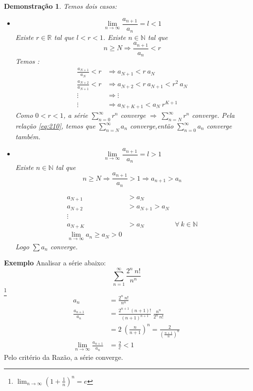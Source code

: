 \documentclass[12pt,openany]{book}
\newtheorem{demonstration}{Demonstração}
\begin{document}
\begin{demonstration}
Temos dois casos:
\begin{itemize}
\item [a.] $$\lim_{n \rightarrow \infty} \frac{a_{n+1}}{a_n} = l < 1 $$ Existe $r \in \mathds{R}$ tal que $l < r < 1$. Existe $n \in \mathds{N}$  tal que $$ n \geq N \Rightarrow \frac{a_{n+1}}{a_n} < r$$
Temos : \begin{align}
\frac{a_{N+1}}{a_N} < r &\Rightarrow  a_{N+1} < r\ a_N \\
\frac{a_{N+2}}{a_{N+1}} < r &\Rightarrow  a_{N+2} < r\ a_{N+1} < r^2\ a_N \\
\vdots &\Rightarrow \vdots \\
\vdots &\Rightarrow a_{N+K+1} < a_N\  r^{K+1} \label{eq:210}
\end{align}
Como $0 < r < 1$, a série $\displaystyle{\sum_{n=0}^{\infty} r^n}$ converge $\displaystyle{\Rightarrow \ \sum_{n=N}^{\infty} r^n}$ converge.
Pela relação \ref{eq:210}, temos que $\displaystyle{\sum_{n=N}^{\infty} a_n}$ converge,então $\displaystyle{\sum_{n=0}^{\infty} a_n}$ converge também.
\item [b.] $$\lim_{n \rightarrow \infty} \frac{a_{n+1}}{a_n} = l > 1 $$ Existe $n \in \mathds{N}$  tal que $$ n \geq N \Rightarrow \frac{a_{n+1}}{a_n} > 1 \Rightarrow a_{n+1} > a_n $$

\begin{align*}
a_{N+1} &> a_N \\
a_{N+2} &> a_{N+1} > a_N\\
\vdots\\
a_{N+K} &> a_N & \forall \ k \in \mathds{N}\\
\lim_{n \rightarrow \infty} a_n \geq a_N > 0
\end{align*}
Logo $\sum a_n$ converge.
\end{itemize}
\end{demonstration}

\hspace{5mm}\textbf{Exemplo} Analisar a série abaixo: $$\sum_{n=1}^{\infty} \frac{2^n \ n!}{n^n}$$ \footnote{$\displaystyle{\lim_{n \rightarrow \infty} \left( 1 + \frac{1}{n} \right)^n = e}$}
\begin{align*}
a_n &= \frac{2^n \ n!}{n^n} \\
\frac{a_{n+1}}{a_n} &=  \frac{2^{n+1} \ (n+1)!}{(n+1)^{n+1}} \ \frac{n^n}{2^n \ n!} \\
&= 2\ \left( \frac{n}{n+1}\right)^n = \frac{2}{\left( \frac{n+1}{n}\right)^n}\\
\lim_{n \rightarrow \infty} \frac{a_{n+1}}{a_n} &= \frac{2}{e} < 1 
\end{align*}
Pelo critério da Razão, a série converge.
\end{document}
